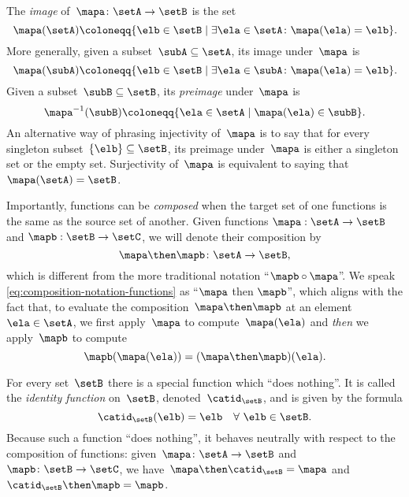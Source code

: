 The \emph{image} of~$\mapa\colon \setA \to \setB$ is the set
\begin{equation}
    \mapa(\setA) \coloneqq \{ \elb \in \setB \mid \exists \ela \in \setA \colon \mapa(\ela) = \elb \}.
\end{equation}
More generally, given a subset~$\subA \subseteq \setA$, its image under~$\mapa$ is
\begin{equation*}
    \mapa(\subA) \coloneqq \{ \elb \in \setB \mid \exists \ela \in \subA \colon \mapa(\ela) = \elb \}.
\end{equation*}
Given a subset~$\subB \subseteq \setB$, its \emph{preimage} under~$\mapa$ is
\begin{equation*}
    \mapa^{-1}(\subB) \coloneqq \{ \ela \in \setA \mid  \mapa(\ela) \in \subB \}.
\end{equation*}
An alternative way of phrasing injectivity of~$\mapa$ is to say that for every singleton subset~$\{ \elb \} \subseteq \setB$, its preimage under~$\mapa$ is either a singleton set or the empty set.
Surjectivity of~$\mapa$ is equivalent to saying that~$\mapa(\setA) = \setB$.

Importantly, functions can be \emph{composed} when the target set of one functions is the same as the source set of another.
Given functions $\mapa: \setA \to \setB$ and $\mapb : \setB \to \setC$, we will denote their composition by
\begin{equation}
    \label{eq:composition-notation-functions}
    \mapa \then \mapb \colon \setA \to \setB,
\end{equation}
which is different from the more traditional notation ``$\mapb \circ \mapa$''.
We speak \cref{eq:composition-notation-functions} as ``$\mapa$ then $\mapb$'', which aligns with the fact that, to evaluate the composition~$\mapa \then \mapb$ at an element~$\ela \in \setA$, we first apply~$\mapa$ to compute~$\mapa(\ela)$ and \emph{then} we apply~$\mapb$ to compute
\begin{equation*}
    \mapb(\mapa(\ela))=(\mapa \then \mapb)(\ela).
\end{equation*}

For every set~$\setB$ there is a special function which ``does nothing''.
It is called the \emph{identity function} on~$\setB$, denoted~$\catid_\setB$, and is given by the formula
\begin{equation*}
    \catid_\setB(\elb) = \elb \quad \forall \ \elb \in \setB.
\end{equation*}
Because such a function ``does nothing'', it behaves neutrally with respect to the composition of functions: given~$\mapa \colon \setA \to \setB$ and~$\mapb \colon \setB \to \setC$, we have~$\mapa \then \catid_\setB = \mapa$ and~$\catid_\setB \then \mapb = \mapb$.

